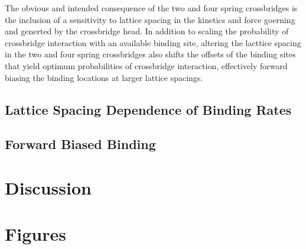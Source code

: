 \documentclass[]{article}
\begin{document}
The obvious and intended consequence of the two and four spring crossbridges is the inclusion of a sensitivity to lattice spacing in the kinetics and force goerning and generted by the crossbridge head. 
In addition to scaling the probability of crossbridge interaction with an available binding site, altering the lacttice spacing in the two and four spring crossbridges also shifts the offsets of the binding sites that yield optimum probabilities of crossbridge interaction, effectively forward biasing the binding locations at larger lattice spacings.


\subsection*{Lattice Spacing Dependence of Binding Rates}



\subsection*{Forward Biased Binding}



\section*{Discussion} %
\label{sec:discussion}





\section*{Figures} %
\label{sec:figures}
\end{document}
